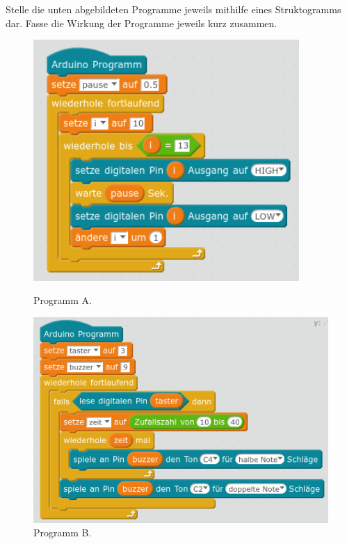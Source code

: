 \begin{aufgabe}
	Stelle die unten abgebildeten Programme jeweils mithilfe eines Struktogramms dar. Fasse die Wirkung der Programme jeweils kurz zusammen.
\end{aufgabe}
\begin{figure}[H]
	\begin{minipage}{0.45\textwidth}
		\centering
		\includegraphics[width=0.9\textwidth]{./lsg/4-2-A1-Lauflicht-Lsg2.png}
		\caption{Programm A.}
	\end{minipage}
	\hfill
	\begin{minipage}{0.52\textwidth}
		\centering
		\includegraphics[width=\textwidth]{./lsg/4-3-Bombe-Lsg1.png}
		\caption{Programm B.}
	\end{minipage}
\end{figure}

